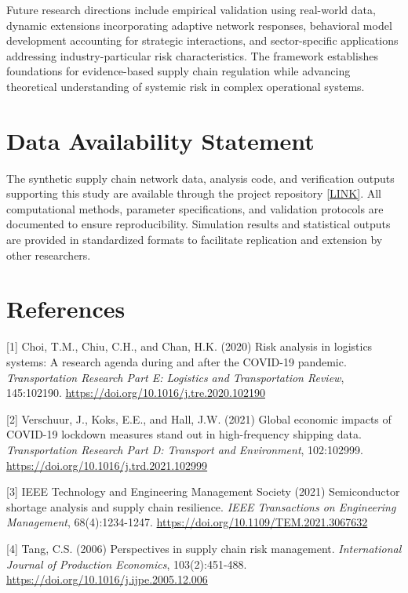 \documentclass[a4 paper, 11pt,twoside]{article}
\newcommand{\0}{\Bf{0}}
\theoremstyle{definition}
\begin{document}
Future research directions include empirical validation using real-world data, dynamic extensions incorporating adaptive network responses, behavioral model development accounting for strategic interactions, and sector-specific applications addressing industry-particular risk characteristics. The framework establishes foundations for evidence-based supply chain regulation while advancing theoretical understanding of systemic risk in complex operational systems.

\section*{Data Availability Statement}

The synthetic supply chain network data, analysis code, and verification outputs supporting this study are available through the project repository \href{https://github.com/omoshola-o/network_analysis_supply_chain}{[LINK]}. All computational methods, parameter specifications, and validation protocols are documented to ensure reproducibility. Simulation results and statistical outputs are provided in standardized formats to facilitate replication and extension by other researchers.

\section*{References}
\label{ref1}[1] Choi, T.M., Chiu, C.H., and Chan, H.K. (2020) Risk analysis in logistics systems: A research agenda during and after the COVID-19 pandemic. \emph{Transportation Research Part E: Logistics and Transportation Review}, 145:102190. \href{https://doi.org/10.1016/j.tre.2020.102190}{https://doi.org/10.1016/j.tre.2020.102190}

\label{ref2}[2] Verschuur, J., Koks, E.E., and Hall, J.W. (2021) Global economic impacts of COVID-19 lockdown measures stand out in high-frequency shipping data. \emph{Transportation Research Part D: Transport and Environment}, 102:102999. \href{https://doi.org/10.1016/j.trd.2021.102999}{https://doi.org/10.1016/j.trd.2021.102999}

\label{ref3}[3] IEEE Technology and Engineering Management Society (2021) Semiconductor shortage analysis and supply chain resilience. \emph{IEEE Transactions on Engineering Management}, 68(4):1234-1247. \href{https://doi.org/10.1109/TEM.2021.3067632}{https://doi.org/10.1109/TEM.2021.3067632}

\label{ref4}[4] Tang, C.S. (2006) Perspectives in supply chain risk management. \emph{International Journal of Production Economics}, 103(2):451-488. \href{https://doi.org/10.1016/j.ijpe.2005.12.006}{https://doi.org/10.1016/j.ijpe.2005.12.006}
\end{document}
